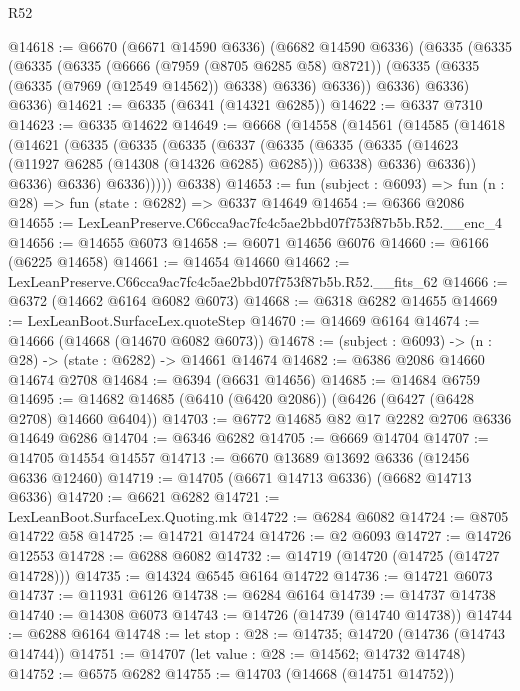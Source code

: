 \begin{lexlean}{R52}
\begin{coremodule}
@14618 := @6670
    (@6671 @14590 @6336)
    (@6682 @14590 @6336)
    (@6335
      (@6335
        (@6335
          (@6335
            (@6666 (@7959 (@8705 @6285 @58) @8721))
            (@6335 (@6335 (@6335 (@7969 (@12549 @14562)) @6338) @6336) @6336))
          @6336)
        @6336)
      @6336)
@14621 := @6335 (@6341 (@14321 @6285))
@14622 := @6337 @7310
@14623 := @6335 @14622
@14649 := @6668
    (@14558
      (@14561
        (@14585
          (@14618
            (@14621
              (@6335
                (@6335
                  (@6335
                    (@6337
                      (@6335
                        (@6335
                          (@6335 (@14623 (@11927 @6285 (@14308 (@14326 @6285) @6285))) @6338)
                          @6336)
                        @6336))
                    @6336)
                  @6336)
                @6336)))))
      @6338)
@14653 := fun (subject : @6093) => fun (n : @28) => fun (state : @6282) => @6337 @14649
@14654 := @6366 @2086
@14655 := LexLeanPreserve.C66cca9ac7fc4c5ae2bbd07f753f87b5b.R52.__enc_4
@14656 := @14655 @6073
@14658 := @6071 @14656 @6076
@14660 := @6166 (@6225 @14658)
@14661 := @14654 @14660
@14662 := LexLeanPreserve.C66cca9ac7fc4c5ae2bbd07f753f87b5b.R52.__fits_62
@14666 := @6372 (@14662 @6164 @6082 @6073)
@14668 := @6318 @6282 @14655
@14669 := LexLeanBoot.SurfaceLex.quoteStep
@14670 := @14669 @6164
@14674 := @14666 (@14668 (@14670 @6082 @6073))
@14678 := (subject : @6093) -> (n : @28) -> (state : @6282) -> @14661 @14674
@14682 := @6386 @2086 @14660 @14674 @2708
@14684 := @6394 (@6631 @14656)
@14685 := @14684 @6759
@14695 := @14682 @14685 (@6410 (@6420 @2086)) (@6426 (@6427 (@6428 @2708) @14660 @6404))
@14703 := @6772 @14685 @82 @17 @2282 @2706 @6336 @14649 @6286
@14704 := @6346 @6282
@14705 := @6669 @14704
@14707 := @14705 @14554 @14557
@14713 := @6670 @13689 @13692 @6336 (@12456 @6336 @12460)
@14719 := @14705 (@6671 @14713 @6336) (@6682 @14713 @6336)
@14720 := @6621 @6282
@14721 := LexLeanBoot.SurfaceLex.Quoting.mk
@14722 := @6284 @6082
@14724 := @8705 @14722 @58
@14725 := @14721 @14724
@14726 := @2 @6093
@14727 := @14726 @12553
@14728 := @6288 @6082
@14732 := @14719 (@14720 (@14725 (@14727 @14728)))
@14735 := @14324 @6545 @6164 @14722
@14736 := @14721 @6073
@14737 := @11931 @6126
@14738 := @6284 @6164
@14739 := @14737 @14738
@14740 := @14308 @6073
@14743 := @14726 (@14739 (@14740 @14738))
@14744 := @6288 @6164
@14748 := let stop : @28 := @14735; @14720 (@14736 (@14743 @14744))
@14751 := @14707 (let value : @28 := @14562; @14732 @14748)
@14752 := @6575 @6282
@14755 := @14703 (@14668 (@14751 @14752))

\end{coremodule}
\end{lexlean}
